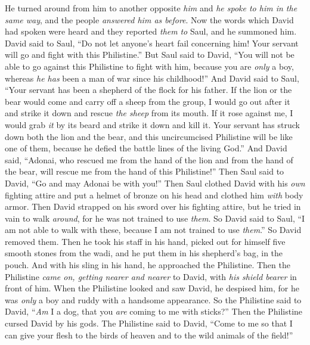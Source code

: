 \begin{biblechapter}
\verse He turned around from him to another opposite \textit{him} and \textit{he spoke to him in the same way}, and the people \textit{answered him as before}.
 Now the words which David had spoken were heard and they reported \textit{them} \textit{to} Saul, and he summoned him.
\verse David said to Saul, “Do not let anyone’s heart fail concerning him! Your servant will go and fight with this Philistine.”
\verse But Saul said to David, “You will not be able to go against this Philistine to fight with him, because you are \textit{only} a boy, whereas \textit{he has} been a man of war since his childhood!”
\verse And David said to Saul, “Your servant has been a shepherd of the flock for his father. If the lion or the bear would come and carry off a sheep from the group,
\verse I would go out after it and strike it down and rescue \textit{the sheep} from its mouth. If it rose against me, I would grab \textit{it} by its beard and strike it down and kill it.
\verse Your servant has struck down both the lion and the bear, and this uncircumcised Philistine will be like one of them, because he defied the battle lines of the living God.”
\verse And David said, “Adonai, who rescued me from the hand of the lion and from the hand of the bear, will rescue me from the hand of this Philistine!” Then Saul said to David, “Go and may Adonai be with you!”
\verse Then Saul clothed David with his \textit{own} fighting attire and put a helmet of bronze on his head and clothed him \textit{with} body armor.
\verse Then David strapped on his sword over his fighting attire, but he tried in vain to walk \textit{around}, for he was not trained to use \textit{them}. So David said to Saul, “I am not able to walk with these, because I am not trained to use \textit{them}.” So David removed them.
\verse Then he took his staff in his hand, picked out for himself five smooth stones from the wadi, and he put them in his shepherd’s bag, in the pouch. And with his sling in his hand, he approached the Philistine.
\verse Then the Philistine \textit{came on, getting nearer and nearer} to David, with \textit{his shield bearer} in front of him.
\verse When the Philistine looked and saw David, he despised him, for he was \textit{only} a boy and ruddy with a handsome appearance.
\verse So the Philistine said to David, “\textit{Am} I a dog, that you \textit{are} coming to me with sticks?” Then the Philistine cursed David by his gods.
\verse The Philistine said to David, “Come to me so that I can give your flesh to the birds of heaven and to the wild animals of the field!”

\end{biblechapter}
